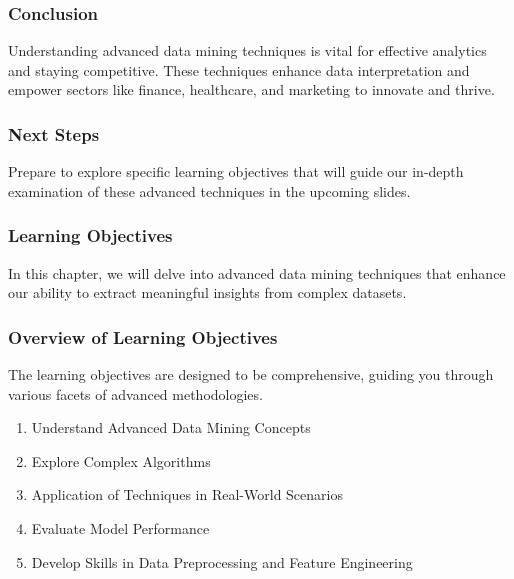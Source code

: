 \documentclass{beamer}
\begin{document}
\begin{frame}[fragile]
    \frametitle{Conclusion}
    Understanding advanced data mining techniques is vital for effective analytics and staying competitive. These techniques enhance data interpretation and empower sectors like finance, healthcare, and marketing to innovate and thrive.
\end{frame}

\begin{frame}[fragile]
    \frametitle{Next Steps}
    Prepare to explore specific learning objectives that will guide our in-depth examination of these advanced techniques in the upcoming slides.
\end{frame}

\begin{frame}[fragile]
    \frametitle{Learning Objectives}
    In this chapter, we will delve into advanced data mining techniques that enhance our ability to extract meaningful insights from complex datasets. 
\end{frame}

\begin{frame}[fragile]
    \frametitle{Overview of Learning Objectives}
    The learning objectives are designed to be comprehensive, guiding you through various facets of advanced methodologies. 

    \begin{enumerate}
        \item Understand Advanced Data Mining Concepts
        \item Explore Complex Algorithms
        \item Application of Techniques in Real-World Scenarios
        \item Evaluate Model Performance
        \item Develop Skills in Data Preprocessing and Feature Engineering
    \end{enumerate}
\end{frame}
\end{document}
